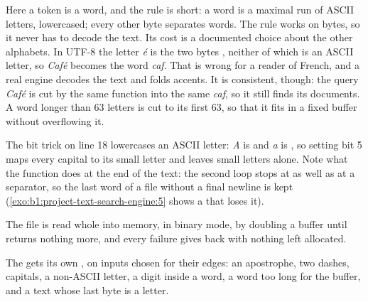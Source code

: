 Here a token is a word, and the rule is short: a word is a maximal run of ASCII letters, lowercased; every other byte
separates words. The rule works on bytes, so it never has to decode the text. Its cost is a documented choice about
the other alphabets. In UTF-8 the letter \emph{é} is the two bytes , neither of which is an ASCII
letter, so \emph{Café} becomes the word \emph{caf}. That is wrong for a reader of French, and a real engine decodes the
text and folds accents. It is consistent, though: the query \emph{Café} is cut by the same function into the same
\emph{caf}, so it still finds its documents. A word longer than 63 letters is cut to its first 63, so that it fits in a
fixed buffer without overflowing it.

\label{lst:b1:project-text-search-engine:next-word}

The bit trick on line 18 lowercases an ASCII letter: \emph{A} is  and \emph{a} is , so setting bit
5 maps every capital to its small letter and leaves small letters alone. Note what the function does at the end of the
text: the second loop stops at  as well as at a separator, so the last word of a file without a final newline
is kept (\cref{exo:b1:project-text-search-engine:5} shows a  that loses it).

The file is read whole into memory, in binary mode, by doubling a buffer until  returns nothing more, and
every failure gives back  with nothing left allocated.

\label{lst:b1:project-text-search-engine:read-file}

The  gets its own , on inputs chosen for their edges: an apostrophe, two dashes, capitals, a
non-ASCII letter, a digit inside a word, a word too long for the buffer, and a text whose last byte is a letter.

\label{lst:b1:project-text-search-engine:tok-test}

